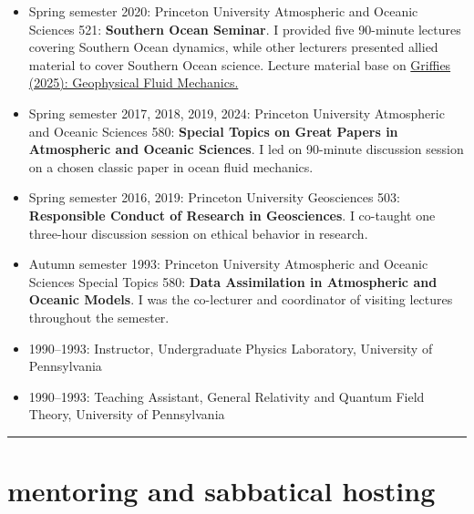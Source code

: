 \documentclass{article}
\begin{document}
\begin{itemize}[leftmargin=*]
\item Spring semester 2020: Princeton University Atmospheric and Oceanic Sciences 521: {\bf Southern Ocean Seminar}. I provided five 90-minute lectures covering Southern Ocean dynamics, while other lecturers presented allied material to cover Southern Ocean science.  Lecture material base on \href{https://stephengriffies.github.io/assets/pdfs/GFM_lectures.pdf}{Griffies (2025): Geophysical Fluid Mechanics.} 

\item Spring semester 2017, 2018, 2019, 2024: Princeton University Atmospheric and Oceanic Sciences 580: {\bf Special Topics on Great Papers in Atmospheric and Oceanic Sciences}. I led on 90-minute discussion session on a chosen classic paper in ocean fluid mechanics. 

\item Spring semester 2016, 2019: Princeton University Geosciences 503: {\bf Responsible Conduct of Research in Geosciences}.  I co-taught one three-hour discussion session on ethical behavior in research. 

\item Autumn semester 1993: Princeton University Atmospheric and Oceanic Sciences Special Topics 580: {\bf Data Assimilation in Atmospheric and Oceanic Models}. I was the co-lecturer and coordinator of visiting lectures throughout the semester. 

\item 1990--1993:  Instructor, Undergraduate Physics Laboratory, University of Pennsylvania 

\item 1990--1993:  Teaching Assistant,  General Relativity and Quantum Field Theory, University of Pennsylvania 

\end{itemize}



\noindent\rule{\textwidth}{1pt}
\vspace{-.5cm}
\section*{\sc  \color{Maroon} mentoring and sabbatical hosting}
\vspace{-.25cm}
\end{document}

